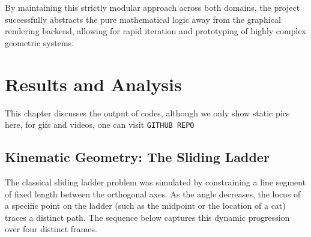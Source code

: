 \documentclass[12pt, a4paper]{report}
\begin{document}
By maintaining this strictly modular approach across both domains, the project successfully abstracts the pure mathematical logic away from the graphical rendering backend, allowing for rapid iteration and prototyping of highly complex geometric systems.




\chapter{Results and Analysis}

This chapter discusses the output of codes, although we only show static pics here, for gifs and videos, one can visit \texttt{GITHUB REPO}

\section{Kinematic Geometry: The Sliding Ladder}

The classical sliding ladder problem was simulated by constraining a line segment of fixed length between the orthogonal axes. As the angle decreases, the locus of a specific point on the ladder (such as the midpoint or the location of a cat) traces a distinct path. The sequence below captures this dynamic progression over four distinct frames.
\end{document}
